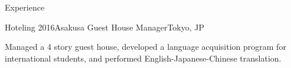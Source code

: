 \documentclass[10pt]{resume} %
\begin{document}
\begin{rSection}{Experience}

  \begin{rSubsection}{Hoteling}
    {2016}{Asakusa Guest House Manager}{Tokyo, JP}
      \item Managed a 4 story guest house, developed a language acquisition
      program for international students, and performed English-Japanese-Chinese
      translation.
  \end{rSubsection}




\end{rSection}

\end{document}
